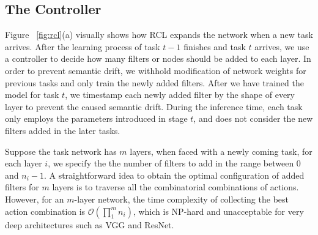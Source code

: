 \documentclass{article}
\begin{document}
\subsection{The Controller}
Figure ~\ref{fig:rcl}(a) visually shows how RCL expands the network when a new task arrives. After the learning process of task $t-1$ finishes and task $t$ arrives, we use a controller to decide how many filters or nodes should be added to each layer. In order to prevent semantic drift, we withhold modification of network weights for previous tasks and only train the newly added filters. After we have trained the model for task $t$, we timestamp each newly added filter by the shape of every layer to prevent the caused semantic drift. During the inference time, each task only employs the parameters introduced in stage $t$,  and does not consider the new filters added in the later tasks.


Suppose the task network has $m$ layers, when faced with a newly coming task, for each layer $i$, we specify the the number of filters to add in the range between $0$ and $n_i-1$. A straightforward idea to obtain the optimal configuration of added filters for  $m$ layers  is to traverse all the  combinatorial combinations of actions. However, for an $m$-layer network, the time complexity of collecting the best action combination is $\mathcal{O}(\prod_1^m n_i)$, which is NP-hard and unacceptable for very deep architectures such as VGG and ResNet.
\end{document}

